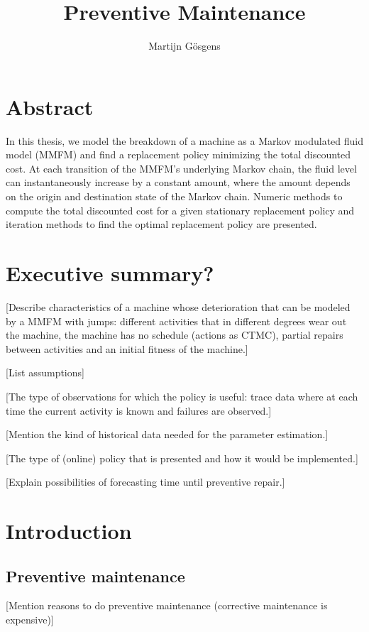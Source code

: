 

\title{Preventive Maintenance}
\author{Martijn G\"{o}sgens}
\maketitle

\chapter*{Abstract}
In this thesis, we model the breakdown of a machine as a Markov modulated fluid model (MMFM) and find a replacement policy minimizing the total discounted cost.
At each transition of the MMFM's underlying Markov chain, the fluid level can instantaneously increase by a constant amount, where the amount depends on the origin and destination state of the Markov chain.
Numeric methods to compute the total discounted cost for a given stationary replacement policy and iteration methods to find the optimal replacement policy are presented.



\chapter*{Executive summary?}
[Describe characteristics of a machine whose deterioration that can be modeled by a MMFM with jumps: different activities that in different degrees wear out the machine, the machine has no schedule (actions as CTMC), partial repairs between activities and an initial fitness of the machine.]

[List assumptions]

[The type of observations for which the policy is useful: trace data where at each time the current activity is known and failures are observed.]

[Mention the kind of historical data needed for the parameter estimation.]

[The type of (online) policy that is presented and how it would be implemented.]

[Explain possibilities of forecasting time until preventive repair.]

\tableofcontents


\chapter{Introduction}
\section{Preventive maintenance}
[Mention reasons to do preventive maintenance (corrective maintenance is expensive)]
